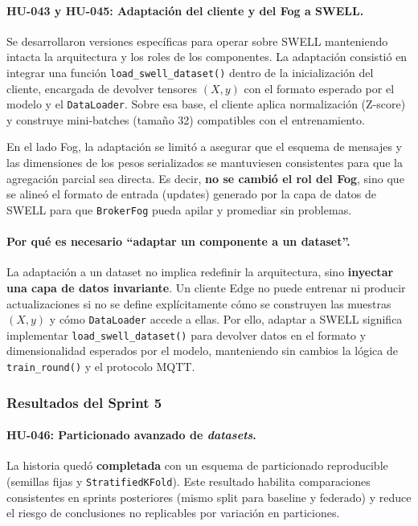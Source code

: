 \documentclass{report}
\begin{document}
\vspace{0.15em}
\paragraph{HU-043 y HU-045: Adaptación del cliente y del Fog a SWELL.}
Se desarrollaron versiones específicas para operar sobre SWELL manteniendo intacta la arquitectura y los roles de los componentes. La adaptación consistió en integrar una función \texttt{load\_swell\_dataset()} dentro de la inicialización del cliente, encargada de devolver tensores $(X,y)$ con el formato esperado por el modelo y el \texttt{DataLoader}. Sobre esa base, el cliente aplica normalización (Z-score) y construye mini-batches (tamaño 32) compatibles con el entrenamiento.

En el lado Fog, la adaptación se limitó a asegurar que el esquema de mensajes y las dimensiones de los pesos serializados se mantuviesen consistentes para que la agregación parcial sea directa. Es decir, \textbf{no se cambió el rol del Fog}, sino que se alineó el formato de entrada (updates) generado por la capa de datos de SWELL para que \texttt{BrokerFog} pueda apilar y promediar sin problemas.

\paragraph{Por qué es necesario ``adaptar un componente a un dataset''.}
La adaptación a un dataset no implica redefinir la arquitectura, sino \textbf{inyectar una capa de datos invariante}. Un cliente Edge no puede entrenar ni producir actualizaciones si no se define explícitamente cómo se construyen las muestras $(X,y)$ y cómo \texttt{DataLoader} accede a ellas. Por ello, adaptar a SWELL significa implementar \texttt{load\_swell\_dataset()} para devolver datos en el formato y dimensionalidad esperados por el modelo, manteniendo sin cambios la lógica de \texttt{train\_round()} y el protocolo MQTT.




\subsubsection{Resultados del Sprint 5}

\paragraph{HU-046: Particionado avanzado de \textit{datasets}.}
La historia quedó \textbf{completada} con un esquema de particionado reproducible (semillas fijas y \texttt{StratifiedKFold}). Este resultado habilita comparaciones consistentes en sprints posteriores (mismo split para baseline y federado) y reduce el riesgo de conclusiones no replicables por variación en particiones.
\end{document}
